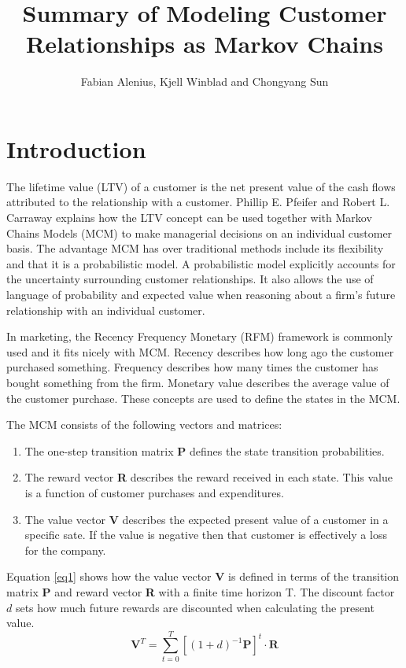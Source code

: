 \documentclass[11pt]{article}
\author{Fabian Alenius, Kjell Winblad and Chongyang Sun}
\title{Summary of Modeling Customer Relationships as Markov Chains}
\begin{document}
\maketitle


\section{Introduction}
The lifetime value (LTV) of a customer is the net present value of the cash flows attributed to the relationship with a customer.
Phillip E. Pfeifer and Robert L. Carraway \cite{customer} explains how the LTV concept can be used together with Markov Chains Models (MCM) to make managerial decisions on an individual customer basis.
The advantage MCM has over traditional methods include its flexibility and that it is a probabilistic model.
A probabilistic model explicitly accounts for the uncertainty surrounding customer relationships.
It also allows the use of language of probability and expected value when reasoning about a firm's future relationship with an individual customer.

In marketing, the Recency Frequency Monetary (RFM) framework is commonly used and it fits nicely with MCM.
Recency describes how long ago the customer purchased something.
Frequency describes how many times the customer has bought something from the firm.
Monetary value describes the average value of the customer purchase.
These concepts are used to define the states in the MCM.

The MCM consists of the following vectors and matrices: 
\begin{enumerate}
\item The one-step transition matrix \textbf{P} defines the state transition probabilities.
\item The reward vector \textbf{R}  describes the reward received in each state. This value is a function of customer purchases and expenditures.
\item The value vector \textbf{V} describes  the expected present value of a customer in a specific sate. If the value is negative then that customer is effectively a loss for the company.
\end{enumerate}

Equation \ref{eq1} shows how the value vector \textbf{V} is defined in terms of the transition matrix  \textbf{P} and reward vector  \textbf{R} with a finite time horizon T.
The discount factor $d$ sets how much future rewards are discounted when calculating the present value.
\begin{equation}\label{eq1}
\textbf{V}^T = \sum_{t=0}^T  [(1 + d)^{-1} \textbf{P}]^t \cdot \textbf{R}
\end{equation}
\end{document}
